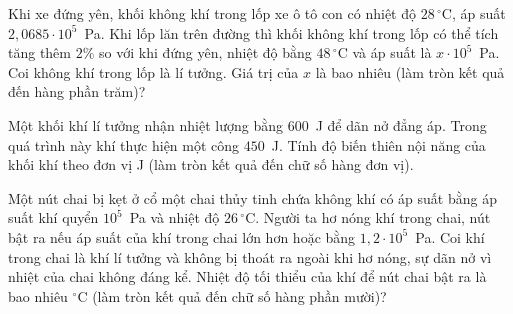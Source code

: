 	\begin{ex}%
		Khi xe đứng yên, khối không khí trong lốp xe ô tô con có nhiệt độ $28\,^\circ\text{C}$, áp suất $2{,}0685\cdot 10^5$~Pa. Khi lốp lăn trên đường thì khối không khí trong lốp có thể tích tăng thêm $2\%$ so với khi đứng yên, nhiệt độ bằng $48\,^\circ\text{C}$ và áp suất là $x\cdot 10^5$~Pa. Coi không khí trong lốp là lí tưởng. Giá trị của $x$ là bao nhiêu (làm tròn kết quả đến hàng phần trăm)?
		\par
	\end{ex}

	\begin{ex}%
		Một khối khí lí tưởng nhận nhiệt lượng bằng $600$~J để dãn nở đẳng áp. Trong quá trình này khí thực hiện một công $450$~J. Tính độ biến thiên nội năng của khối khí theo đơn vị J (làm tròn kết quả đến chữ số hàng đơn vị).
		\par
	\end{ex}

	\begin{ex}%
		Một nút chai bị kẹt ở cổ một chai thủy tinh chứa không khí có áp suất bằng áp suất khí quyển $10^5$~Pa và nhiệt độ $26\,^\circ\text{C}$. Người ta hơ nóng khí trong chai, nút bật ra nếu áp suất của khí trong chai lớn hơn hoặc bằng $1{,}2\cdot 10^5$~Pa. Coi khí trong chai là khí lí tưởng và không bị thoát ra ngoài khi hơ nóng, sự dãn nở vì nhiệt của chai không đáng kể. Nhiệt độ tối thiểu của khí để nút chai bật ra là bao nhiêu $^\circ$C (làm tròn kết quả đến chữ số hàng phần mười)?
		\par
	\end{ex}

